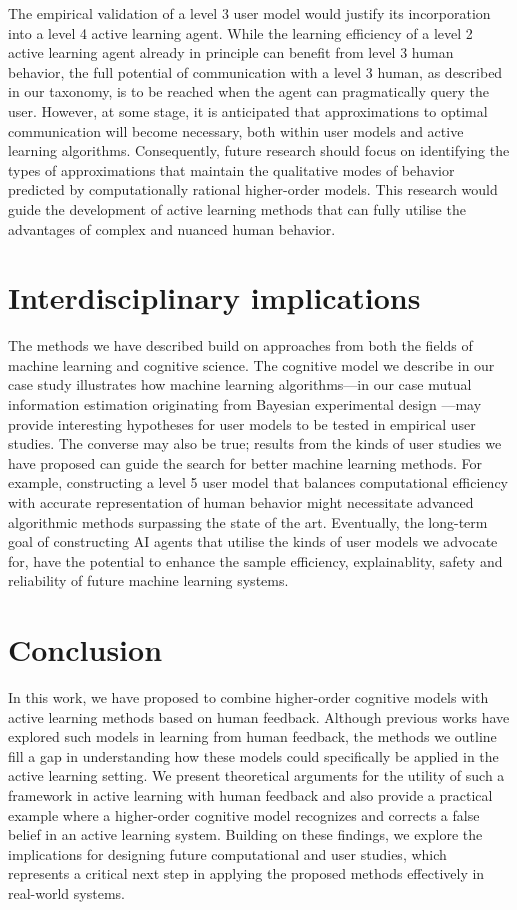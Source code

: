 \documentclass[letterpaper]{article} %
\begin{document}
The empirical validation of a level 3 user model would justify its incorporation into a level 4 active learning agent. While the learning efficiency of a level 2 active learning agent already in principle can benefit from level 3 human behavior, the full potential of communication with a level 3 human, as described in our taxonomy, is to be reached when the agent can pragmatically query the user. However, at some stage, it is anticipated that approximations to optimal communication will become necessary, both within user models and active learning algorithms. Consequently, future research should focus on identifying the types of approximations that maintain the qualitative modes of behavior predicted by computationally rational higher-order models. This research would guide the development of active learning methods that can fully utilise the advantages of complex and nuanced human behavior.

\section{Interdisciplinary implications}

The methods we have described build on approaches from both the fields of machine learning and cognitive science. The cognitive model we describe in our case study illustrates how machine learning algorithms---in our case mutual information estimation originating from Bayesian experimental design \cite{rainforth2023modern}---may provide interesting hypotheses for user models to be tested in empirical user studies. The converse may also be true; results from the kinds of user studies we have proposed can guide the search for better machine learning methods. For example, constructing a level 5 user model that balances computational efficiency with accurate representation of human behavior might necessitate advanced algorithmic methods surpassing the state of the art. Eventually, the long-term goal of constructing AI agents that utilise the kinds of user models we advocate for, have the potential to enhance the sample efficiency, explainablity, safety and reliability of future machine learning systems.

\section{Conclusion}

In this work, we have proposed to combine higher-order cognitive models with active learning methods based on human feedback. Although previous works have explored such models in learning from human feedback, the methods we outline fill a gap in understanding how these models could specifically be applied in the active learning setting. We present theoretical arguments for the utility of such a framework in active learning with human feedback and also provide a practical example where a higher-order cognitive model recognizes and corrects a false belief in an active learning system. Building on these findings, we explore the implications for designing future computational and user studies, which represents a critical next step in applying the proposed methods effectively in real-world systems.



\end{document}
